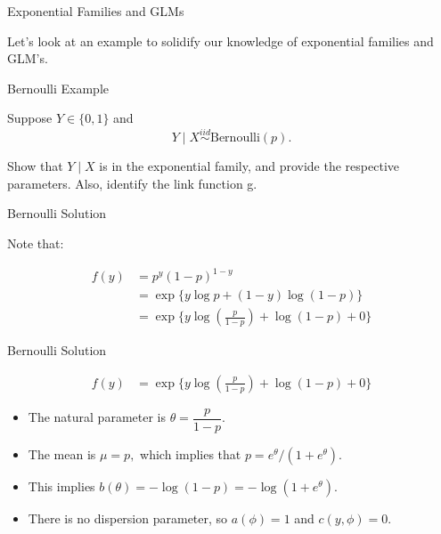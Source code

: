 \documentclass[
  ignorenonframetext,
]{beamer}
\begin{document}
\begin{frame}{Exponential Families and GLMs}
\protect\hypertarget{exponential-families-and-glms-1}{}

\center
\Large

Let's look at an example to solidify our knowledge of exponential
families and GLM's.

\end{frame}

\begin{frame}{Bernoulli Example}
\protect\hypertarget{bernoulli-example}{}

Suppose \(Y \in \{ 0, 1\}\) and
\[Y\mid X \stackrel{iid}{\sim} \text{Bernoulli}(p).\]

Show that \(Y \mid X\) is in the exponential family, and provide the
respective parameters. Also, identify the link function g.

\end{frame}

\begin{frame}{Bernoulli Solution}
\protect\hypertarget{bernoulli-solution}{}

Note that:

\begin{align}
f(y) &= p^y(1-p)^{1-y} \\
&= \exp\{
y \log p + (1-y) \log(1-p)
\} \\
&= \exp\{
y \log ({\frac{p}{1-p}}) + \log(1-p) + 0
\} 
\end{align}

\end{frame}

\begin{frame}{Bernoulli Solution}
\protect\hypertarget{bernoulli-solution-1}{}

\begin{align}
f(y) &= \exp\{
y \log ({\frac{p}{1-p}}) + \log(1-p) + 0
\} 
\end{align}

\begin{itemize}
\item
  The natural parameter is \(\theta = \dfrac{p}{1-p}.\)
\item
  The mean is \(\mu = p,\) which implies that
  \(p = e^{\theta}/(1 + e^{\theta}).\)
\item
  This implies \(b(\theta) = -\log(1-p) = -\log(1 + e^{\theta}).\)
\item
  There is no dispersion parameter, so \(a(\phi) = 1\) and
  \(c(y,\phi) = 0.\)
\end{itemize}

\end{frame}
\end{document}
